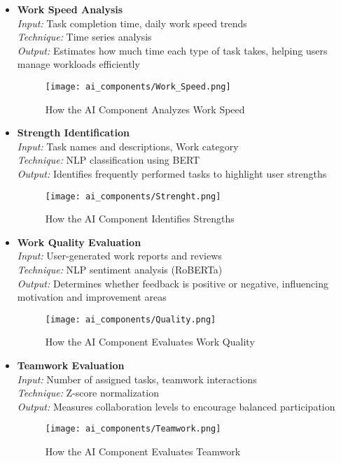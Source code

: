 \begin{itemize}
    \item \textbf{Work Speed Analysis} 
    \\ \textit{Input:} Task completion time, daily work speed trends  
    \\ \textit{Technique:} Time series analysis  
    \\ \textit{Output:} Estimates how much time each type of task takes, helping users manage workloads efficiently  
    \begin{figure}[H]
        \centering
        \texttt{[image: ai\_components/Work\_Speed.png]}
        \caption{How the AI Component Analyzes Work Speed}
    \end{figure}

    \item \textbf{Strength Identification}  
    \\ \textit{Input:} Task names and descriptions, Work category  
    \\ \textit{Technique:} NLP classification using BERT  
    \\ \textit{Output:} Identifies frequently performed tasks to highlight user strengths  
    \begin{figure}[H]
        \centering
        \texttt{[image: ai\_components/Strenght.png]}
        \caption{How the AI Component Identifies Strengths}
    \end{figure}

    \item \textbf{Work Quality Evaluation}  
    \\ \textit{Input:} User-generated work reports and reviews  
    \\ \textit{Technique:} NLP sentiment analysis (RoBERTa)  
    \\ \textit{Output:} Determines whether feedback is positive or negative, influencing motivation and improvement areas  
    \begin{figure}[H]
        \centering
        \texttt{[image: ai\_components/Quality.png]}
        \caption{How the AI Component Evaluates Work Quality}
    \end{figure}
   

    \item \textbf{Teamwork Evaluation}  
    \\ \textit{Input:} Number of assigned tasks, teamwork interactions  
    \\ \textit{Technique:} Z-score normalization  
    \\ \textit{Output:} Measures collaboration levels to encourage balanced participation  
    \begin{figure}[H]
        \centering
        \texttt{[image: ai\_components/Teamwork.png]}
        \caption{How the AI Component Evaluates Teamwork}
    \end{figure}


\end{itemize}
